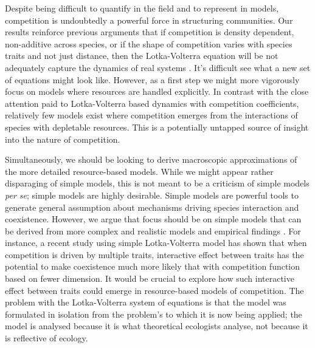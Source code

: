 \documentclass[a4paper,11pt]{article}
\begin{document}
Despite being difficult to quantify in the field and to represent in
models, competition is undoubtedly a powerful force in structuring
communities.
%
Our results reinforce previous arguments that if competition is
density dependent, non-additive across species, or if the shape of
competition varies with species traits and not just distance, then the
Lotka-Volterra equation will be not adequately capture the dynamics of
real systems \citep{Andrewartha-1953, Neill-1974, Abrams-1975,
  Wangersky-1978,Abrams-1980, Tilman-1987}.  It's difficult see what a
new set of equations might look like.  However, as a first step we
might more vigorously focus on models where resources are handled
explicitly.  In contrast with the close attention
paid to Lotka-Volterra based dynamics with competition coefficients,
relatively few models exist where competition emerges from the
interactions of species with depletable resources. This is a potentially
untapped source of insight into the nature of competition.

Simultaneously, we should be looking to derive macroscopic
approximations of the more detailed resource-based models.  While we
might appear rather disparaging of simple models, this is not meant
to be a criticism of simple models \textit{per se}; simple models are
highly desirable.  Simple models are powerful tools to generate general assumption about mechanisms driving species interaction and coexistence. However, we argue that focus should be on simple models
that can be derived from more complex and realistic models and
empirical findings \citep[e.g.][]{Champagnat-2006}. For instance, a recent study \citep{Doebeli-2010} using simple Lotka-Volterra model has shown that when competition is driven by multiple traits, interactive effect between traits has the potential to make coexistence much more likely that with competition function based on fewer dimension. It would be crucial to explore how such interactive effect between traits could emerge in resource-based models of competition.
The problem with the Lotka-Volterra system of equations is that the
model was formulated in isolation from the problem's to which it is
now being applied; the model is analysed because it is what
theoretical ecologists analyse, not because it is reflective of
ecology.


\clearpage
\end{document}
